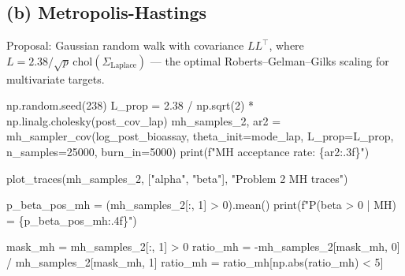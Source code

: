 \documentclass[
  letterpaper,
  DIV=11,
  numbers=noendperiod]{scrartcl}
\newenvironment{Shaded}{\begin{snugshade}}{\end{snugshade}}
\newcommand{\BuiltInTok}[1]{\textcolor[rgb]{0.00,0.23,0.31}{#1}}
\newcommand{\DecValTok}[1]{\textcolor[rgb]{0.68,0.00,0.00}{#1}}
\newcommand{\FloatTok}[1]{\textcolor[rgb]{0.68,0.00,0.00}{#1}}
\newcommand{\NormalTok}[1]{\textcolor[rgb]{0.00,0.23,0.31}{#1}}
\newcommand{\OperatorTok}[1]{\textcolor[rgb]{0.37,0.37,0.37}{#1}}
\newcommand{\SpecialCharTok}[1]{\textcolor[rgb]{0.37,0.37,0.37}{#1}}
\newcommand{\SpecialStringTok}[1]{\textcolor[rgb]{0.13,0.47,0.30}{#1}}
\newcommand{\StringTok}[1]{\textcolor[rgb]{0.13,0.47,0.30}{#1}}
\begin{document}
\subsection{(b) Metropolis-Hastings}\label{b-metropolis-hastings-1}

Proposal: Gaussian random walk with covariance \(L L^\top\), where
\(L = 2.38/\sqrt{p}\,\text{chol}(\Sigma_{\text{Laplace}})\) --- the
optimal Roberts--Gelman--Gilks scaling for multivariate targets.

\begin{Shaded}
\begin{Highlighting}[]
\NormalTok{np.random.seed(}\DecValTok{238}\NormalTok{)}
\NormalTok{L\_prop }\OperatorTok{=} \FloatTok{2.38} \OperatorTok{/}\NormalTok{ np.sqrt(}\DecValTok{2}\NormalTok{) }\OperatorTok{*}\NormalTok{ np.linalg.cholesky(post\_cov\_lap)}
\NormalTok{mh\_samples\_2, ar2 }\OperatorTok{=}\NormalTok{ mh\_sampler\_cov(log\_post\_bioassay, theta\_init}\OperatorTok{=}\NormalTok{mode\_lap,}
\NormalTok{                                   L\_prop}\OperatorTok{=}\NormalTok{L\_prop, n\_samples}\OperatorTok{=}\DecValTok{25000}\NormalTok{, burn\_in}\OperatorTok{=}\DecValTok{5000}\NormalTok{)}
\BuiltInTok{print}\NormalTok{(}\SpecialStringTok{f"MH acceptance rate: }\SpecialCharTok{\{}\NormalTok{ar2}\SpecialCharTok{:.3f\}}\SpecialStringTok{"}\NormalTok{)}

\NormalTok{plot\_traces(mh\_samples\_2, [}\StringTok{"alpha"}\NormalTok{, }\StringTok{"beta"}\NormalTok{], }\StringTok{"Problem 2 MH traces"}\NormalTok{)}

\NormalTok{p\_beta\_pos\_mh }\OperatorTok{=}\NormalTok{ (mh\_samples\_2[:, }\DecValTok{1}\NormalTok{] }\OperatorTok{\textgreater{}} \DecValTok{0}\NormalTok{).mean()}
\BuiltInTok{print}\NormalTok{(}\SpecialStringTok{f"P(beta \textgreater{} 0 | MH) = }\SpecialCharTok{\{}\NormalTok{p\_beta\_pos\_mh}\SpecialCharTok{:.4f\}}\SpecialStringTok{"}\NormalTok{)}

\NormalTok{mask\_mh }\OperatorTok{=}\NormalTok{ mh\_samples\_2[:, }\DecValTok{1}\NormalTok{] }\OperatorTok{\textgreater{}} \DecValTok{0}
\NormalTok{ratio\_mh }\OperatorTok{=} \OperatorTok{{-}}\NormalTok{mh\_samples\_2[mask\_mh, }\DecValTok{0}\NormalTok{] }\OperatorTok{/}\NormalTok{ mh\_samples\_2[mask\_mh, }\DecValTok{1}\NormalTok{]}
\NormalTok{ratio\_mh }\OperatorTok{=}\NormalTok{ ratio\_mh[np.}\BuiltInTok{abs}\NormalTok{(ratio\_mh) }\OperatorTok{\textless{}} \DecValTok{5}\NormalTok{]}


\end{Highlighting}
\end{Shaded}
\end{document}
